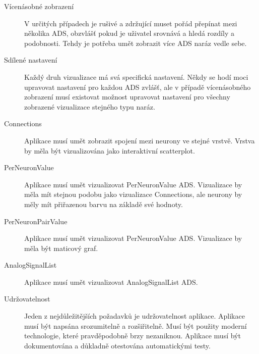 \begin{description}
  \item[Vícenásobné zobrazení] V určitých případech je rušivé a zdržující muset pořád přepínat mezi několika ADS, obzvlášť pokud je uživatel srovnává a hledá rozdíly a podobnosti. Tehdy je potřeba umět zobrazit více ADS naráz vedle sebe.
  \item[Sdílené nastavení] Každý druh vizualizace má svá specifická nastavení. Někdy se hodí moci upravovat nastavení pro každou ADS zvlášť, ale v případě vícenásobného zobrazení musí existovat možnost upravovat nastavení pro všechny zobrazené vizualizace stejného typu naráz.
  \item[Connections] Aplikace musí umět zobrazit spojení mezi neurony ve stejné vrstvě. Vrstva by měla být vizualizována jako interaktivní scatterplot.
  \item[PerNeuronValue] Aplikace musí umět vizualizovat PerNeuronValue ADS. Vizualizace by měla mít stejnou podobu jako vizualizace Connections, ale neurony by měly mít přiřazenou barvu na základě své hodnoty.
  \item[PerNeuronPairValue] Aplikace musí umět vizualizovat PerNeuronValue ADS. Vizualizace by měla být maticový graf.
  \item[AnalogSignalList] Aplikace musí umět vizualizovat AnalogSignalList ADS.
  \item[Udržovatelnost] Jeden z nejdůležitějších požadavků je udržovatelnost aplikace. Aplikace musí být napsána srozumitelně a rozšiřitelně. Musí být použity moderní technologie, které pravděpodobně brzy nezaniknou. Aplikace musí být dokumentována a důkladně otestována automatickými testy.
\end{description}